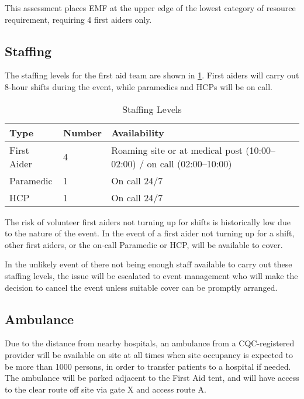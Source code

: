 This assessment places EMF at the upper edge of the lowest category of resource
requirement, requiring 4 first aiders only.

\subsection{Staffing}

The staffing levels for the first aid team are shown in \cref{table:fastaffing}.
First aiders will carry out 8-hour shifts during the event, while paramedics
and HCPs will be on call.

\begin{table}[h!]
\caption{Staffing Levels}
\label{table:fastaffing}
\centering
\begin{tabular}{| l l l |}
    \hline
        \textbf{Type} & \textbf{Number} & \textbf{Availability} \\
    \hline
        First Aider & 4 & Roaming site or at medical post (10:00--02:00) / on call (02:00--10:00) \\
        Paramedic & 1 & On call 24/7 \\
        HCP & 1 & On call 24/7 \\
    \hline
\end{tabular}
\end{table}

The risk of volunteer first aiders not turning up for shifts is historically low due
to the nature of the event. In the event of a first aider not turning up for a shift,
other first aiders, or the on-call Paramedic or HCP, will be available to cover.

In the unlikely event of there not being enough staff available to carry out these
staffing levels, the issue will be escalated to event management who will make the
decision to cancel the event unless suitable cover can be promptly arranged.

\subsection{Ambulance}

Due to the distance from nearby hospitals, an ambulance from a CQC-registered provider 
will be available on site at all times when site occupancy is expected to be more than
1000 persons, in order to transfer patients to a hospital if needed. The ambulance will be parked
adjacent to the First Aid tent, and will have access to the clear route off site via gate
X and access route A.

